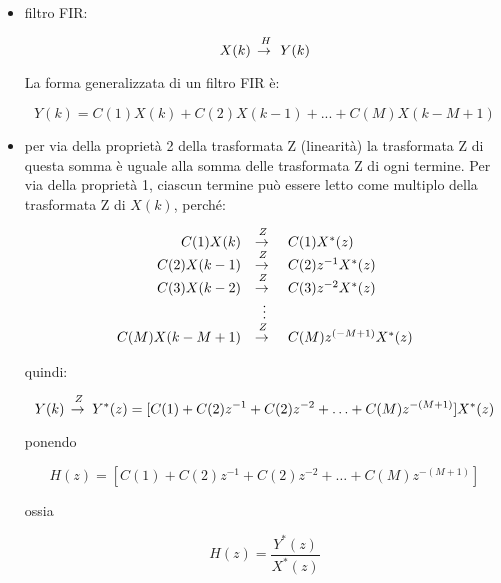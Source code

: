 \begin{itemize}

\item filtro FIR:
				
		\begin{equation}
			X(k)\,\raiseto{H}\,Y(k)
		\end{equation}

		La forma generalizzata di un filtro FIR \`e:
  
		\begin{equation}
    	Y(k) = C(1)X(k) + C(2)X(k-1) + ... + C(M)X(k-M+1)
		\end{equation}

\item per via della propriet\`a 2 della trasformata Z (linearit\`a) la trasformata Z di questa somma
     \`e uguale alla somma delle trasformata Z di ogni termine. Per via della propriet\`a
     1, ciascun termine pu\`o essere letto come multiplo della trasformata Z di $X(k)$,
     perch\'e:
 
		 \begin{equation}
			 \begin{array}{r c l}
						 C(1)X(k) & \raiseto{Z} & C(1)X^{*}(z)\\
						 C(2)X(k-1) & \raiseto{Z} & C(2)z^{-1}X^{*}(z)\\
						 C(3)X(k-2) & \raiseto{Z} & C(3)z^{-2}X^{*}(z)\\
						            & \vdots & \\
						 C(M)X(k-M+1) & \raiseto{Z} & C(M)z^{(-M+1)}X^{*}(z)\\
		    \end{array}
		 \end{equation}
 
     quindi:

		 \begin{equation}
						 Y(k)\,\raiseto{Z}\,Y^{*}(z) = [ C(1)+C(2)z^{-1}+C(2)z^{-2}+ \ldots +C(M)z^{-(M+1)} ] X^{*}(z)
		 \end{equation}
 
		 ponendo
 
		 \begin{equation}
			 H(z) = [ C(1)+C(2)z^{-1}+C(2)z^{-2}+ \ldots +C(M)z^{-(M+1)} ]
		 \end{equation}
 
     ossia
 
		 \begin{equation}
						 H(z) = \frac{Y^{*}(z)}{X^{*}(z)}
		 \end{equation}
 

\end{itemize}
